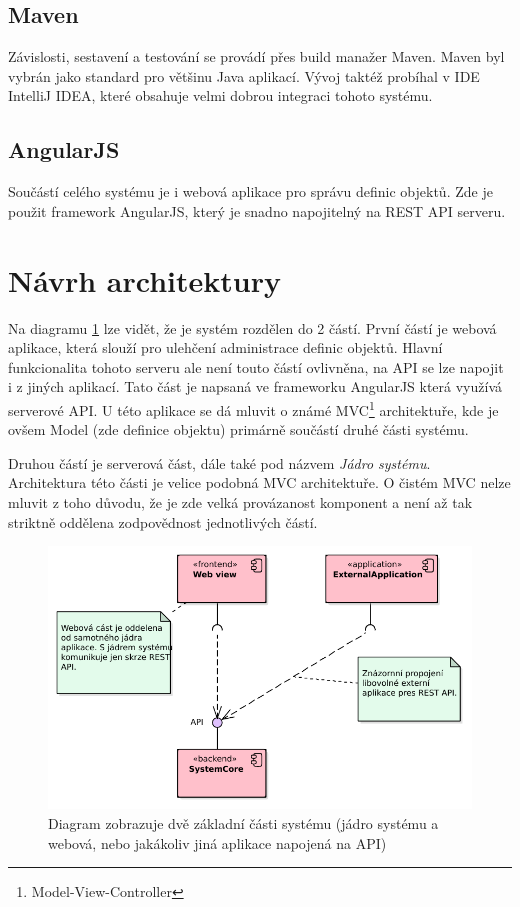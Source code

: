 \documentclass[thesis=B,czech]{FITthesis}[2012/06/26]
\begin{document}
   \subsection{Maven}
   Závislosti, sestavení a testování se provádí přes build manažer Maven. Maven byl vybrán jako standard pro většinu Java aplikací.
   Vývoj taktéž probíhal v IDE IntelliJ IDEA, které obsahuje velmi dobrou integraci tohoto systému.
   
   \subsection{AngularJS}
   Součástí celého systému je i webová aplikace pro správu definic objektů. Zde je použit framework AngularJS, který je snadno napojitelný
   na REST API serveru. 

   \newpage
   
 \section{Návrh architektury}
  Na diagramu \ref{parts} lze vidět, že je systém rozdělen do 2 částí. První částí je webová aplikace, která slouží pro ulehčení administrace definic objektů.
  Hlavní funkcionalita tohoto serveru ale není touto částí ovlivněna, na API se lze napojit i z jiných aplikací.
  Tato část je napsaná ve frameworku AngularJS která využívá serverové API.
  U této aplikace se dá mluvit o známé MVC\footnote{Model-View-Controller} architektuře, kde je ovšem Model (zde definice objektu)
  primárně součástí druhé části systému.
  
  Druhou částí je serverová část, dále také pod názvem \textit{Jádro systému}. Architektura této části je velice podobná MVC architektuře. O čistém MVC nelze 
  mluvit z toho důvodu, že je zde velká provázanost komponent a není až tak striktně oddělena zodpovědnost jednotlivých částí.
  
  \begin{figure}\centering
 	\includegraphics[width=1\textwidth]{Component_Model.pdf}
 	\caption[Základní části systému]{Diagram zobrazuje dvě základní části systému (jádro systému a webová, nebo jakákoliv jiná aplikace napojená na API)}\label{parts}
 \end{figure}
  
\end{document}
